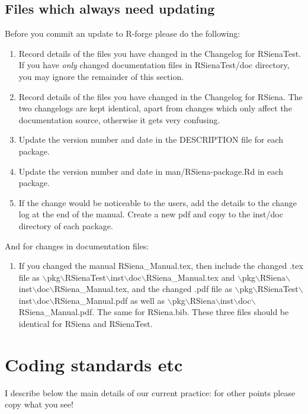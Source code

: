 \documentclass[12pt, a4paper]{article}
\renewcommand{\=}{\,=\,}
\newcommand{\+}{\,+\,}
\newcommand{\bs}{\backslash}
\begin{document}
\subsection{Files which always need updating}
 Before you commit an update to R-forge please do the following:
\begin{enumerate}
\item Record details of the files you have changed in the Changelog for
  RSienaTest. If you have \emph{only} changed documentation files in
  \textsf{RSienaTest/doc} directory, you may ignore the remainder of this
  section.
\item Record details of the files you have changed in the Changelog for RSiena.
  The two changelogs are kept identical, apart from changes which only affect
  the documentation source, otherwise it gets very confusing.
\item Update the version number and date in the \textsf{DESCRIPTION} file for
  each package.
\item Update the version number and date in \textsf{man/RSiena-package.Rd} in
  each package.
\item If the change would be noticeable to the users, add the details to the
  change log at the end of the manual. Create a new pdf and copy to the inst/doc
  directory of each package.
\end{enumerate}

And for changes in documentation files:
\begin{enumerate}
\item If you changed the manual \textsf{RSiena\_Manual.tex}, then include the
  changed .tex file as \textsf{$\bs$pkg$\bs$RSienaTest$\bs$inst$\bs$doc$\bs$RSiena\_Manual.tex} and
  \textsf{$\bs$pkg$\bs$RSiena$\bs$inst$\bs$doc$\bs$RSiena\_Manual.tex},
  and the changed .pdf file as
  \textsf{$\bs$pkg$\bs$RSienaTest$\bs$inst$\bs$doc$\bs$RSiena\_Manual.pdf} as well as
  \textsf{$\bs$pkg$\bs$RSiena$\bs$inst$\bs$doc$\bs$RSiena\_Manual.pdf}. The same for \textsf{RSiena.bib}.
  These three files should be identical for \textsf{RSiena} and \textsf{RSienaTest}.
\end{enumerate}

\section{Coding standards etc}

I describe below the main details of our current practice: for other points
please copy what you see!
\end{document}
